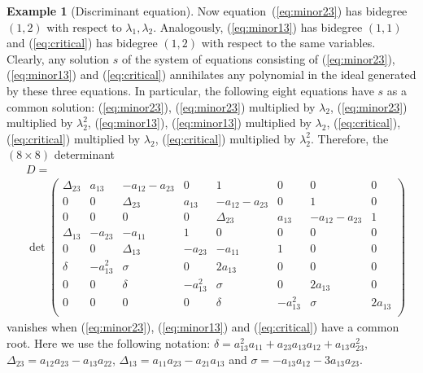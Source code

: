 \documentclass[10pt,twoside,a4paper,reqno]{amsart}
\theoremstyle{plain}
\theoremstyle{definition}
\newtheorem{exam+}           {Example}
\theoremstyle{remark}
\newenvironment{example}{\begin{exam+}}{\end{exam+}}
\begin{document}
\begin{example}[Discriminant equation]
Now equation~(\ref{eq:minor23}) has bidegree $(1,2)$ with respect to
$\lambda_1, \lambda_2$. Analogously,  (\ref{eq:minor13}) has bidegree
$(1,1)$ and (\ref{eq:critical}) has bidegree   $(1,2)$ with respect to the same variables. Clearly, 
any  solution $s$ of the system of equations consisting of (\ref{eq:minor23}), (\ref{eq:minor13}) and 
(\ref{eq:critical}) annihilates  any polynomial in the ideal generated by these
three equations. In particular, the following eight equations have  $s$ as a 
common solution:
(\ref{eq:minor23}), (\ref{eq:minor23}) multiplied by
$\lambda_2$, (\ref{eq:minor23}) multiplied by $\lambda_2^2$,
(\ref{eq:minor13}), (\ref{eq:minor13}) multiplied by
$\lambda_2$, (\ref{eq:critical}), (\ref{eq:critical}) multiplied
by $\lambda_2$, (\ref{eq:critical}) multiplied by $\lambda_2^2$. 
Therefore, the $(8\times 8)$ determinant  
\begin{equation*}
\begin{split}
&D=\\
&\det\left(\begin{array}{cccccccc}
\Delta_{23} & a_{13} & -a_{12}-a_{23} & 0 & 1 & 0 & 0 & 0 \\
 0 & 0 & \Delta_{23} & a_{13} & -a_{12}-a_{23} & 0 & 1 & 0 \\
 0 & 0 & 0 & 0 & \Delta_{23} & a_{13} & -a_{12}-a_{23} & 1 \\
 \Delta_{13} & -a_{23} & -a_{11} & 1 & 0 & 0 & 0 & 0 \\
0 & 0 & \Delta_{13} & -a_{23} & -a_{11} & 1 & 0 & 0 \\
\delta  & -a_{13}^2 & \sigma & 0 & 2 a_{13} & 0 & 0 & 0 \\
0 & 0 & \delta  & -a_{13}^2 & \sigma & 0 & 2 a_{13} & 0\\
0 & 0 & 0 & 0 & \delta & -a_{13}^2 & \sigma & 2 a_{13} \\
\end{array}\right)
\end{split}
\end{equation*}
vanishes when
(\ref{eq:minor23}), (\ref{eq:minor13}) and
(\ref{eq:critical}) have a common root.
Here we use the following notation: $\delta=a_{13}^2 a_{11}+a_{23} a_{13} a_{12}+a_{13} a_{23}^2$,
$\Delta_{23}=a_{12} a_{23}-a_{13} a_{22}$, $\Delta_{13}=a_{11}
a_{23}-a_{21} a_{13}$ and $\sigma=-a_{13} a_{12}-3 a_{13} a_{23}$.


\end{example}
\end{document}
